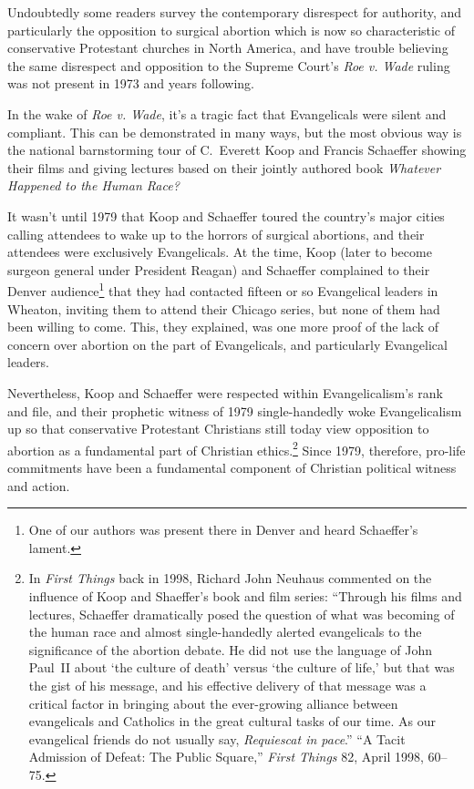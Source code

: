 \documentclass[
]{book}
\begin{document}
Undoubtedly some readers survey the contemporary disrespect for authority, and particularly the opposition to surgical abortion which is now so characteristic of conservative Protestant churches in North America, and have trouble believing the same disrespect and opposition to the Supreme Court's \emph{Roe v. Wade} ruling was not present in 1973 and years following.

In the wake of \emph{Roe v. Wade}, it's a tragic fact that Evangelicals were silent and compliant. This can be demonstrated in many ways, but the most obvious way is the national barnstorming tour of C.~Everett Koop and Francis Schaeffer showing their films and giving lectures based on their jointly authored book \emph{Whatever Happened to the Human Race?}

It wasn't until 1979 that Koop and Schaeffer toured the country's major cities calling attendees to wake up to the horrors of surgical abortions, and their attendees were exclusively Evangelicals. At the time, Koop (later to become surgeon general under President Reagan) and Schaeffer complained to their Denver audience\footnote{One of our authors was present there in Denver and heard Schaeffer's lament.} that they had contacted fifteen or so Evangelical leaders in Wheaton, inviting them to attend their Chicago series, but none of them had been willing to come. This, they explained, was one more proof of the lack of concern over abortion on the part of Evangelicals, and particularly Evangelical leaders.

Nevertheless, Koop and Schaeffer were respected within Evangelicalism's rank and file, and their prophetic witness of 1979 single-handedly woke Evangelicalism up so that conservative Protestant Christians still today view opposition to abortion as a fundamental part of Christian ethics.\footnote{In \emph{First Things} back in 1998, Richard John Neuhaus commented on the influence of Koop and Shaeffer's book and film series: ``Through his films and lectures, Schaeffer dramatically posed the question of what was becoming of the human race and almost single-handedly alerted evangelicals to the significance of the abortion debate. He did not use the language of John Paul~II about `the culture of death' versus `the culture of life,' but that was the gist of his message, and his effective delivery of that message was a critical factor in bringing about the ever-growing alliance between evangelicals and Catholics in the great cultural tasks of our time. As our evangelical friends do not usually say, \emph{Requiescat in pace}.'' ``A Tacit Admission of Defeat: The Public Square,'' \emph{First Things} 82, April 1998, 60--75.} Since 1979, therefore, pro-life commitments have been a fundamental component of Christian political witness and action.
\end{document}
